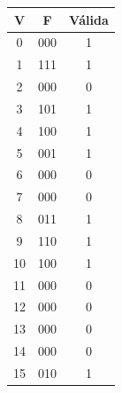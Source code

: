 \documentclass[12pt]{article}
\begin{document}
\begin{center}
    \begin{tabular}{|c|c|c|}
    \hline
    V & F & Válida\\
    \hline
    0 & 000 & 1 \\
    \hline
    1 & 111 & 1 \\
    \hline
    2 & 000 & 0 \\
    \hline
    3 & 101 & 1 \\
    \hline
    4 & 100 & 1 \\
    \hline
    5 & 001 & 1 \\
    \hline
    6 & 000 & 0 \\
    \hline
    7 & 000 & 0 \\
    \hline
    8 & 011 & 1 \\
    \hline
    9 & 110 & 1 \\
    \hline
    10 & 100 & 1 \\
    \hline
    11 & 000 & 0 \\
    \hline
    12 & 000 & 0 \\
    \hline
    13 & 000 & 0 \\
    \hline
    14 & 000 & 0 \\
    \hline
    15 & 010 & 1 \\
    \hline
    \end{tabular}
    \end{center}
\end{document}
